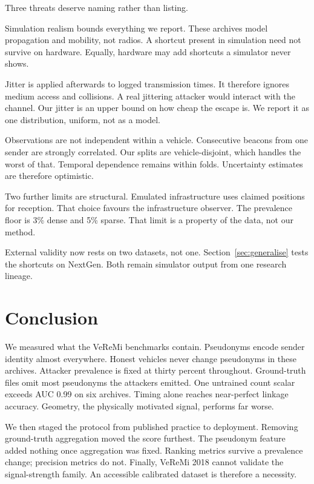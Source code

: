 \documentclass[conference]{IEEEtran}
\begin{document}
Three threats deserve naming rather than listing.

Simulation realism bounds everything we report.
These archives model propagation and mobility, not radios.
A shortcut present in simulation need not survive on hardware.
Equally, hardware may add shortcuts a simulator never shows.

Jitter is applied afterwards to logged transmission times.
It therefore ignores medium access and collisions.
A real jittering attacker would interact with the channel.
Our jitter is an upper bound on how cheap the escape is.
We report it as one distribution, uniform, not as a model.

Observations are not independent within a vehicle.
Consecutive beacons from one sender are strongly correlated.
Our splits are vehicle-disjoint, which handles the worst of that.
Temporal dependence remains within folds.
Uncertainty estimates are therefore optimistic.

Two further limits are structural.
Emulated infrastructure uses claimed positions for reception.
That choice favours the infrastructure observer.
The prevalence floor is 3\% dense and 5\% sparse.
That limit is a property of the data, not our method.

External validity now rests on two datasets, not one.
Section~\ref{sec:generalise} tests the shortcuts on NextGen.
Both remain simulator output from one research lineage.

\section{Conclusion}

We measured what the VeReMi benchmarks contain.
Pseudonyms encode sender identity almost everywhere.
Honest vehicles never change pseudonyms in these archives.
Attacker prevalence is fixed at thirty percent throughout.
Ground-truth files omit most pseudonyms the attackers emitted.
One untrained count scalar exceeds AUC 0.99 on six archives.
Timing alone reaches near-perfect linkage accuracy.
Geometry, the physically motivated signal, performs far worse.

We then staged the protocol from published practice to deployment.
Removing ground-truth aggregation moved the score furthest.
The pseudonym feature added nothing once aggregation was fixed.
Ranking metrics survive a prevalence change; precision metrics do not.
Finally, VeReMi 2018 cannot validate the signal-strength family.
An accessible calibrated dataset is therefore a necessity.
\end{document}
